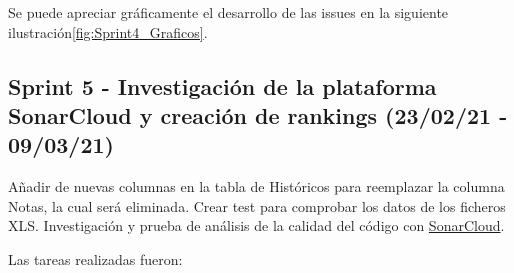 Se puede apreciar gráficamente el desarrollo de las issues en la siguiente ilustración\ref{fig:Sprint4_Graficos}.


\subsection{Sprint 5 - Investigación de la plataforma SonarCloud y creación de rankings (23/02/21 - 09/03/21)}
Añadir de nuevas columnas en la tabla de Históricos para reemplazar la columna Notas, la cual será eliminada. Crear test para comprobar los datos de los ficheros XLS. Investigación y prueba de análisis de la calidad del código con \href{https://sonarcloud.io/}{SonarCloud}.

Las tareas realizadas fueron:
